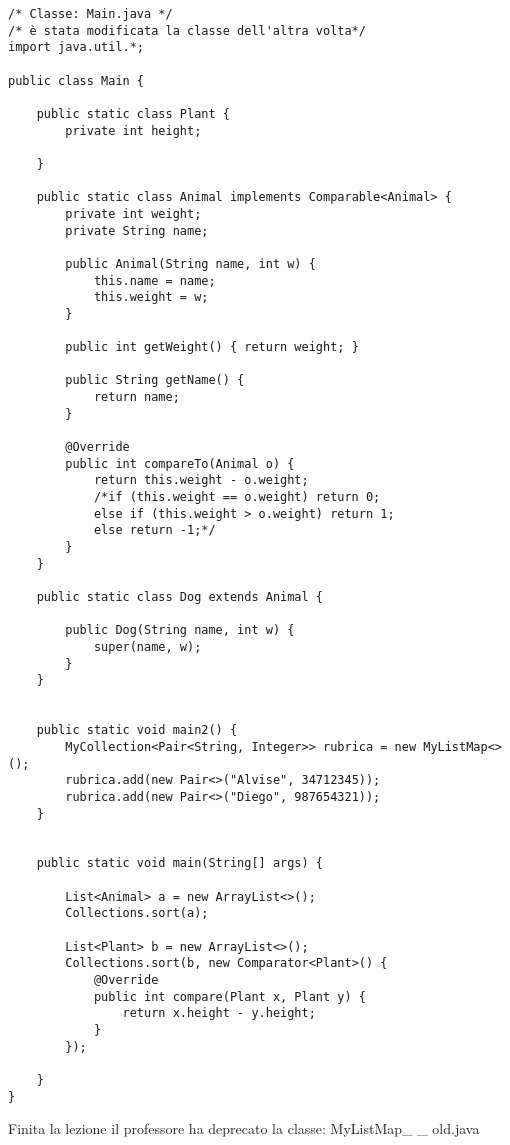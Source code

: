 \begin{lstlisting}[basicstyle=\small,]
/* Classe: Main.java */
/* è stata modificata la classe dell'altra volta*/
import java.util.*;

public class Main {

    public static class Plant {
        private int height;

    }

    public static class Animal implements Comparable<Animal> {
        private int weight;
        private String name;

        public Animal(String name, int w) {
            this.name = name;
            this.weight = w;
        }

        public int getWeight() { return weight; }

        public String getName() {
            return name;
        }

        @Override
        public int compareTo(Animal o) {
            return this.weight - o.weight;
            /*if (this.weight == o.weight) return 0;
            else if (this.weight > o.weight) return 1;
            else return -1;*/
        }
    }

    public static class Dog extends Animal {

        public Dog(String name, int w) {
            super(name, w);
        }
    }


    public static void main2() {
        MyCollection<Pair<String, Integer>> rubrica = new MyListMap<>();
        rubrica.add(new Pair<>("Alvise", 34712345));
        rubrica.add(new Pair<>("Diego", 987654321));
    }


    public static void main(String[] args) {

        List<Animal> a = new ArrayList<>();
        Collections.sort(a);

        List<Plant> b = new ArrayList<>();
        Collections.sort(b, new Comparator<Plant>() {
            @Override
            public int compare(Plant x, Plant y) {
                return x.height - y.height;
            }
        });

    }
}
\end{lstlisting}

\noindent Finita la lezione il professore ha deprecato la classe: MyListMap\_ \_ old.java